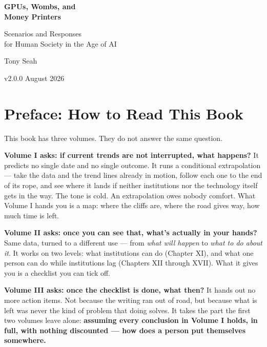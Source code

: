 \documentclass[11pt,a4paper]{article}
\begin{document}
\begin{titlepage}
\centering
\vspace*{4cm}
{\Huge\bfseries GPUs, Wombs, and\\[0.3em] Money Printers\par}
\vspace{1cm}
{\LARGE\color{subtitlecolor} Scenarios and Responses\\for Human Society in the Age of AI\par}
\vspace{3cm}
{\Large Tony Seah\par}
\vspace{3.8cm}
{\large v2.0.0 \quad August 2026\par}
\vfill
\end{titlepage}

\tableofcontents
\thispagestyle{empty}
\newpage
\setcounter{page}{1}

\section{Preface: How to Read This Book}

This book has three volumes. They do not answer the same question.

\textbf{Volume I asks: if current trends are not interrupted, what happens?} It predicts no single date and no single outcome. It runs a conditional extrapolation --- take the data and the trend lines already in motion, follow each one to the end of its rope, and see where it lands if neither institutions nor the technology itself gets in the way. The tone is cold. An extrapolation owes nobody comfort. What Volume I hands you is a map: where the cliffs are, where the road gives way, how much time is left.

\textbf{Volume II asks: once you can see that, what's actually in your hands?} Same data, turned to a different use --- from \textit{what will happen} to \textit{what to do about it}. It works on two levels: what institutions can do (Chapter XI), and what one person can do while institutions lag (Chapters XII through XVII). What it gives you is a checklist you can tick off.

\textbf{Volume III asks: once the checklist is done, what then?} It hands out no more action items. Not because the writing ran out of road, but because what is left was never the kind of problem that doing solves. It takes the part the first two volumes leave alone: \textbf{assuming every conclusion in Volume I holds, in full, with nothing discounted --- how does a person put themselves somewhere.}
\end{document}
